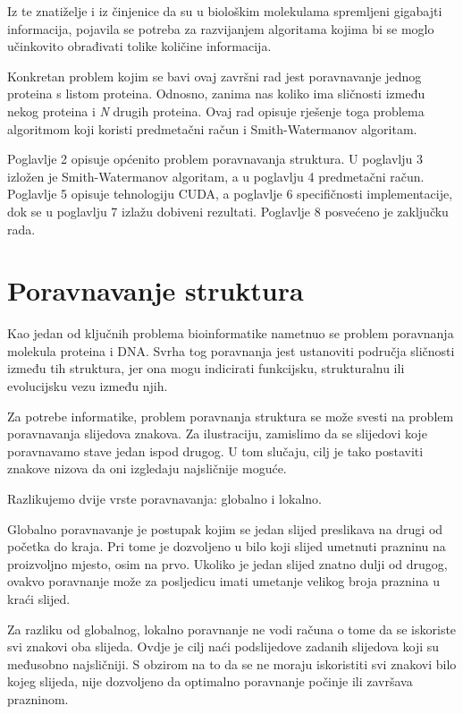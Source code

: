 \documentclass[times, utf8, zavrsni, numeric]{fer}
\begin{document}
Iz te znatiželje i iz činjenice da su u biološkim molekulama spremljeni gigabajti informacija, pojavila se potreba za razvijanjem algoritama kojima bi se moglo učinkovito obrađivati tolike količine informacija.

Konkretan problem kojim se bavi ovaj završni rad jest poravnavanje jednog proteina s listom proteina. Odnosno, zanima nas koliko ima sličnosti između nekog proteina i \textit{N} drugih proteina. Ovaj rad opisuje rješenje toga problema algoritmom koji koristi predmetačni račun i Smith-Watermanov algoritam.

Poglavlje 2 opisuje općenito problem poravnavanja struktura. U poglavlju 3 izložen je Smith-Watermanov algoritam, a u poglavlju 4 predmetačni račun.
Poglavlje 5 opisuje tehnologiju CUDA, a poglavlje 6 specifičnosti implementacije, dok se u poglavlju 7 izlažu dobiveni rezultati. Poglavlje 8 posvećeno je zaključku rada.


\chapter{Poravnavanje struktura}
\indent

Kao jedan od ključnih problema bioinformatike nametnuo se problem poravnanja molekula proteina i DNA. Svrha tog poravnanja jest ustanoviti područja sličnosti između tih struktura, jer ona mogu indicirati funkcijsku, strukturalnu ili evolucijsku vezu između njih\cite{salign}.

Za potrebe informatike, problem poravnanja struktura se može svesti na problem poravnavanja slijedova znakova. Za ilustraciju, zamislimo da se slijedovi koje poravnavamo stave jedan ispod drugog. U tom slučaju, cilj je tako postaviti znakove nizova da oni izgledaju najsličnije moguće.

Razlikujemo dvije vrste poravnavanja: globalno i lokalno.

Globalno poravnavanje je postupak kojim se jedan slijed preslikava na drugi od početka do kraja. Pri tome je dozvoljeno u bilo koji slijed umetnuti prazninu na proizvoljno mjesto, osim na prvo. Ukoliko je jedan slijed znatno dulji od drugog, ovakvo poravnanje može za posljedicu imati umetanje velikog broja praznina u kraći slijed.

Za razliku od globalnog, lokalno poravnanje ne vodi računa o tome da se iskoriste svi znakovi oba slijeda. Ovdje je cilj naći podslijedove zadanih slijedova koji su međusobno najsličniji. S obzirom na to da se ne moraju iskoristiti svi znakovi bilo kojeg slijeda, nije dozvoljeno da optimalno poravnanje počinje ili završava prazninom.
\end{document}
